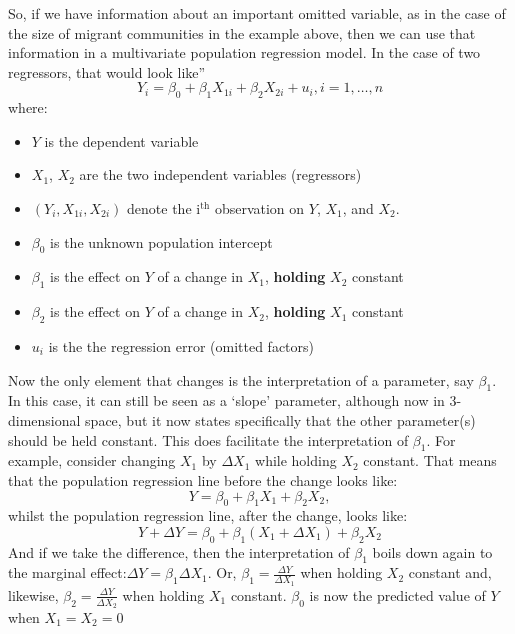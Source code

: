 \documentclass[
]{book}
\providecommand{\tightlist}{%
  \setlength{\itemsep}{0pt}\setlength{\parskip}{0pt}}
\begin{document}
So, if we have information about an important omitted variable, as in the case of the size of migrant communities in the example above, then we can use that information in a multivariate population regression model. In the case of two regressors, that would look like''
\begin{equation}
Y_i =\beta_0 + \beta_1 X_{1i} + \beta_2 X_{2i} + u_i, i=1,\ldots,n
\end{equation}
where:

\begin{itemize}
\tightlist
\item
  \(Y\) is the dependent variable
\item
  \(X_1\), \(X_2\) are the two independent variables (regressors)
\item
  \((Y_i, X_{1i}, X_{2i})\) denote the i\(^{\mathrm{th}}\) observation on \(Y\), \(X_1\), and \(X_2\).
\item
  \(\beta_0\) is the unknown population intercept
\item
  \(\beta_1\) is the effect on \(Y\) of a change in \(X_1\), \textbf{holding} \(X_2\) constant
\item
  \(\beta_2\) is the effect on \(Y\) of a change in \(X_2\), \textbf{holding} \(X_1\) constant
\item
  \(u_i\) is the the regression error (omitted factors)
\end{itemize}

Now the only element that changes is the interpretation of a parameter, say \(\beta_1\). In this case, it can still be seen as a `slope' parameter, although now in 3-dimensional space, but it now states specifically that the other parameter(s) should be held constant. This does facilitate the interpretation of \(\beta_1\). For example, consider changing \(X_1\) by \(\Delta X_1\) while holding \(X_2\) constant. That means that the population regression line before the change looks like:
\begin{equation}
Y = \beta_0 + \beta_1 X_{1} + \beta_2 X_{2},
\end{equation}
whilst the population regression line, after the change, looks like:
\begin{equation}
Y + \Delta Y = \beta_0 + \beta_1 (X_{1} + \Delta X_1) + \beta_2 X_{2}
\end{equation}
And if we take the difference, then the interpretation of \(\beta_1\) boils down again to the marginal effect:\(\Delta Y = \beta_1 \Delta X_1\). Or, \(\beta_1 = \frac{\Delta Y}{\Delta X_1}\) when holding \(X_2\) constant and, likewise, \(\beta_2 = \frac{\Delta Y}{\Delta X_2}\) when holding \(X_1\) constant. \(\beta_0\) is now the predicted value of \(Y\) when \(X_1 = X_2 = 0\)
\end{document}
